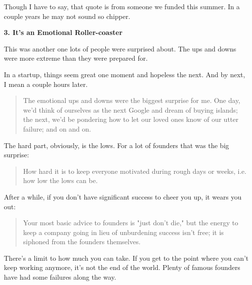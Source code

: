                   Though I have to say, that quote is from someone we funded
                  this summer. In a couple years he may not sound so chipper.


                  \textbf{3. It's an Emotional Roller-coaster}

This was
                  another one lots of people were surprised about. The ups and
                  downs were more extreme than they were prepared for.

In
                  a startup, things seem great one moment and hopeless the next.
                  And by next, I mean a couple hours later.
                  \begin{quote}

                    The emotional ups and downs were the biggest surprise for
                    me. One day, we'd think of ourselves as the next Google and
                    dream of buying islands; the next, we'd be pondering how to
                    let our loved ones know of our utter failure; and on and on.
                  
\end{quote}

                  The hard part, obviously, is the lows. For a lot of founders
                  that was the big surprise:
                  \begin{quote}

                    How hard it is to keep everyone motivated during rough days
                    or weeks, i.e. how low the lows can be.
                  
\end{quote}

                  After a while, if you don't have significant success to cheer
                  you up, it wears you out:
                  \begin{quote}

                    Your most basic advice to founders is "just don't die," but
                    the energy to keep a company going in lieu of unburdening
                    success isn't free; it is siphoned from the founders
                    themselves.
                  
\end{quote}

                  There's a limit to how much you can take. If you get to the
                  point where you can't keep working anymore, it's not the end
                  of the world. Plenty of famous founders have had some failures
                  along the way.


